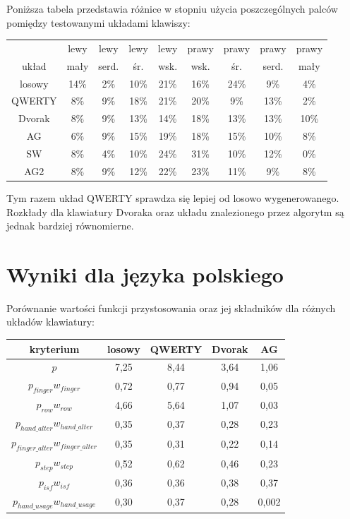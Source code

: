 \documentclass{xmgr}
\begin{document}
Poniższa tabela przedstawia różnice w stopniu użycia poszczególnych palców pomiędzy testowanymi układami klawiszy:\newline\newline
\begin{tabular}{ c | c | c | c | c | c | c | c | c }
                & lewy & lewy  & lewy & lewy & prawy & prawy & prawy & prawy \\
  układ         & mały & serd. & śr. & wsk. & wsk. & śr. & serd. & mały \\
  \hline
  losowy        & 14\% & 2\% & 10\% & 21\% & 16\% & 24\% & 9\%  & 4\% \\
  QWERTY        &  8\% & 9\% & 18\% & 21\% & 20\% & 9\%  & 13\% & 2\% \\
  Dvorak        &  8\% & 9\% & 13\% & 14\% & 18\% & 13\% & 13\% & 10\% \\
  AG            &  6\% & 9\% & 15\% & 19\% & 18\% & 15\% & 10\% & 8\% \\
  SW            &  8\% & 4\% & 10\% & 24\% & 31\% & 10\% & 12\% & 0\% \\
  AG2           &  8\% & 9\% & 12\% & 22\% & 23\% & 11\% &  9\% & 8\% \\
\end{tabular}\newline

Tym razem układ QWERTY sprawdza się lepiej od losowo wygenerowanego. Rozkłady dla klawiatury Dvoraka oraz układu znalezionego przez algorytm są jednak bardziej równomierne.


\section{Wyniki dla języka polskiego}

Porównanie wartości funkcji przystosowania oraz jej składników dla różnych układów klawiatury:\newline\newline
\begin{tabular}{ c | c | c | c | c }
  kryterium         & losowy & QWERTY & Dvorak & AG \\
  \hline
  $p$			& 7,25 & 8,44 & 3,64 & 1,06 \\
  \hline
  $p_{finger} w_{finger}$                & 0,72 & 0,77 & 0,94 & 0,05 \\
  $p_{row} w_{row}$                      & 4,66 & 5,64 & 1,07 & 0,03 \\
  $p_{hand\_alter} w_{hand\_alter}$      & 0,35 & 0,37 & 0,28 & 0,23 \\
  $p_{finger\_alter} w_{finger\_alter}$  & 0,35 & 0,31 & 0,22 & 0,14 \\
  $p_{step} w_{step}$                    & 0,52 & 0,62 & 0,46 & 0,23 \\
  $p_{isf} w_{isf}$                      & 0,36 & 0,36 & 0,38 & 0,37 \\
  $p_{hand\_usage} w_{hand\_usage}$      & 0,30 & 0,37 & 0,28 & 0,002 \\
\end{tabular}\newline\newline
\end{document}
